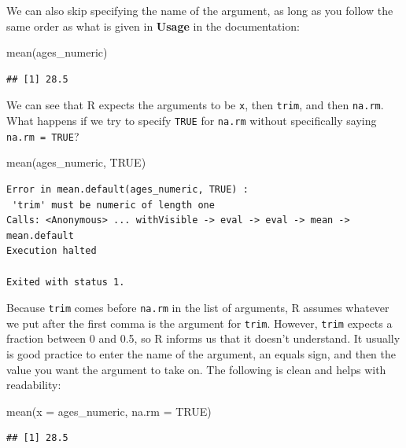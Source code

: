 \documentclass[]{tufte-book}
\newenvironment{Shaded}{\begin{snugshade}}{\end{snugshade}}
\newcommand{\AttributeTok}[1]{\textcolor[rgb]{0.77,0.63,0.00}{#1}}
\newcommand{\ConstantTok}[1]{\textcolor[rgb]{0.00,0.00,0.00}{#1}}
\newcommand{\FunctionTok}[1]{\textcolor[rgb]{0.00,0.00,0.00}{#1}}
\newcommand{\NormalTok}[1]{#1}
\begin{document}
We can also skip specifying the name of the argument, as long as you follow the same order as what is given in \textbf{Usage} in the documentation:

\begin{Shaded}
\begin{Highlighting}[]
\FunctionTok{mean}\NormalTok{(ages\_numeric)}
\end{Highlighting}
\end{Shaded}

\begin{verbatim}
## [1] 28.5
\end{verbatim}

We can see that R expects the arguments to be \texttt{x}, then \texttt{trim}, and then \texttt{na.rm}. What happens if we try to specify \texttt{TRUE} for \texttt{na.rm} without specifically saying \texttt{na.rm\ =\ TRUE}?

\begin{Shaded}
\begin{Highlighting}[]
\FunctionTok{mean}\NormalTok{(ages\_numeric, }\ConstantTok{TRUE}\NormalTok{)}
\end{Highlighting}
\end{Shaded}

\begin{verbatim}
Error in mean.default(ages_numeric, TRUE) :
 'trim' must be numeric of length one
Calls: <Anonymous> ... withVisible -> eval -> eval -> mean -> mean.default
Execution halted

Exited with status 1.
\end{verbatim}

Because \texttt{trim} comes before \texttt{na.rm} in the list of arguments, R assumes whatever we put after the first comma is the argument for \texttt{trim}. However, \texttt{trim} expects a fraction between 0 and 0.5, so R informs us that it doesn't understand. It usually is good practice to enter the name of the argument, an equals sign, and then the value you want the argument to take on. The following is clean and helps with readability:

\begin{Shaded}
\begin{Highlighting}[]
\FunctionTok{mean}\NormalTok{(}\AttributeTok{x =}\NormalTok{ ages\_numeric, }\AttributeTok{na.rm =} \ConstantTok{TRUE}\NormalTok{)}
\end{Highlighting}
\end{Shaded}

\begin{verbatim}
## [1] 28.5
\end{verbatim}
\end{document}
